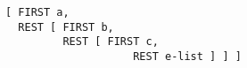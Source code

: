 \documentclass[a4paper]{article}
\begin{document}
{\small\begin{verbatim}
[ FIRST a,
  REST [ FIRST b, 
         REST [ FIRST c,
	                REST e-list ] ] ]
\end{verbatim}}
\end{document}
